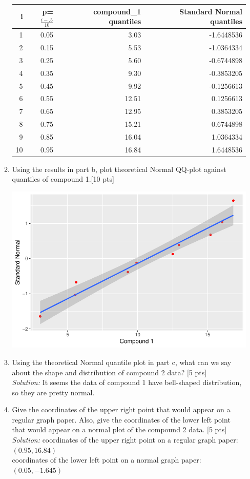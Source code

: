 \documentclass[11pt]{article}\usepackage[]{graphicx}\usepackage[]{color}
\begin{document}
\begin{enumerate}
\begin{enumerate}
\begin{center}
\begin{tabular}{r|r|r|r}
\hline
i & p=$\frac{i-.5}{10}$ & compound_1 quantiles & Standard Normal quantiles\\
\hline
1 & 0.05 & 3.03 & -1.6448536\\
\hline
2 & 0.15 & 5.53 & -1.0364334\\
\hline
3 & 0.25 & 5.60 & -0.6744898\\
\hline
4 & 0.35 & 9.30 & -0.3853205\\
\hline
5 & 0.45 & 9.92 & -0.1256613\\
\hline
6 & 0.55 & 12.51 & 0.1256613\\
\hline
7 & 0.65 & 12.95 & 0.3853205\\
\hline
8 & 0.75 & 15.21 & 0.6744898\\
\hline
9 & 0.85 & 16.04 & 1.0364334\\
\hline
10 & 0.95 & 16.84 & 1.6448536\\
\hline
\end{tabular}
\end{center}

    \item Using the results in part b, plot theoretical Normal QQ-plot against quantiles of compound 1.[10 pts]
    
    
\includegraphics{stat305-hw3_s20_sol-003}
    
    \item Using the theoretical Normal quantile plot in part c, what can we say about the shape and distribution of compound 2 data? [5 pts]\\
   \emph{Solution:} It seems the data of compound 1 have bell-shaped distribution, so they are pretty normal.
    \item Give the coordinates  of the upper right point that would appear on a regular graph paper. Also, give the coordinates of the lower left point that would appear on a normal plot of the compound 2 data. [5 pts]\\
    \emph{Solution:} coordinates  of the upper right point on a regular graph paper: $(0.95, 16.84)$\\
    coordinates  of the lower left point on a normal graph paper: $(0.05, -1.645)$
\end{enumerate}    



\end{enumerate}
\end{document}
